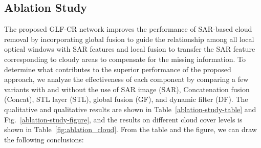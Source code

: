 \documentclass[a4paper,fleqn]{cas-dc}
\begin{document}
\subsection{Ablation Study}
The proposed GLF-CR network improves the performance of SAR-based cloud removal by incorporating global fusion to guide the relationship among all local optical windows with SAR features and local fusion to transfer the SAR feature corresponding to cloudy areas to compensate for the missing information. To determine what contributes to the superior performance of the proposed approach, we analyze the effectiveness of each component by comparing a few variants with and without the use of SAR image (SAR), Concatenation fusion (Concat), STL layer (STL), global fusion (GF), and dynamic filter (DF). The qualitative and qualitative results are shown in Table~\ref{ablation-study-table} and Fig.~\ref{ablation-study-figure}, and the results on different cloud cover levels is shown in Table~\ref{fig:ablation_cloud}.
From the table and the figure, we can draw the following conclusions:

\begin{table}[!t]
	\small
	\centering
	\caption{Quantitative ablation study of proposed algorithm with and without use of the SAR image (SAR), Concatenation fusion (Concat), STL layer (STL), global fusion (GF), and dynamic filter (DF).}
	\label{ablation-study-table}
	\vspace{-5mm}
\end{table}
\end{document}
